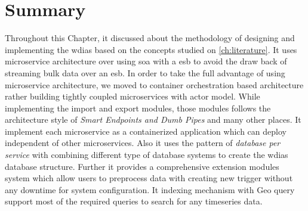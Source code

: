 \section{Summary}
\label{se:method_summary}

Throughout this Chapter, it discussed about the methodology of designing and implementing the \acrshort{wdias} based on the concepts studied on \cref{ch:literature}. It uses microservice architecture over using \acrshort{soa} with a \acrshort{esb} to avoid the draw back of streaming bulk data over an \acrshort{esb}. In order to take the full advantage of using microservice architecture, we moved to container orchestration based architecture rather building tightly coupled microservices with actor model.
While implementing the import and export modules, those modules follows the architecture style of \emph{Smart Endpoints and Dumb Pipes} and many other places. It implement each microservice as a containerized application which can deploy independent of other microservices. Also it uses the pattern of \emph{database per service} with combining different type of database systems to create the \acrshort{wdias} database structure. Further it provides a comprehensive extension modules system which allow users to preprocess data with creating new trigger without any downtime for system configuration. It indexing mechanism with Geo query support most of the required queries to search for any timeseries data.
